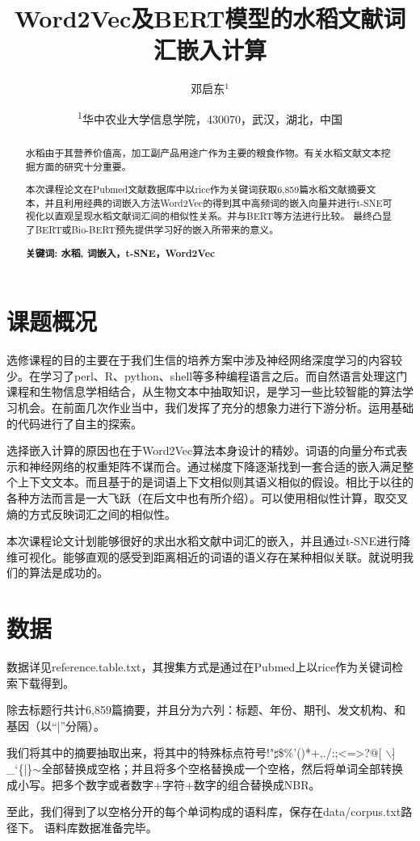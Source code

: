 \documentclass{article}
\title{Word2Vec及BERT模型的水稻文献词汇嵌入计算}%
\author{邓启东$^{1}$}
\date{
\textsuperscript{1}华中农业大学信息学院，430070，武汉，湖北，中国}
\begin{document}
\maketitle


\begin{abstract}

水稻由于其营养价值高，加工副产品用途广作为主要的粮食作物。有关水稻文献文本挖掘方面的研究十分重要。\par 本次课程论文在Pubmed文献数据库中以rice作为关键词获取6,859篇水稻文献摘要文本，并且利用经典的词嵌入方法Word2Vec的得到其中高频词的嵌入向量并进行t-SNE可视化以直观呈现水稻文献词汇间的相似性关系。并与BERT等方法进行比较。
最终凸显了BERT或Bio-BERT预先提供学习好的嵌入所带来的意义。

{\bf 关键词: 水稻, 词嵌入，t-SNE，Word2Vec}
\end{abstract}


\maketitle

\section{课题概况}
选修课程的目的主要在于我们生信的培养方案中涉及神经网络深度学习的内容较少。在学习了perl、R、python、shell等多种编程语言之后。而自然语言处理这门课程和生物信息学相结合，从生物文本中抽取知识，是学习一些比较智能的算法学习机会。在前面几次作业当中，我们发挥了充分的想象力进行下游分析。运用基础的代码进行了自主的探索。\par
选择嵌入计算的原因也在于Word2Vec算法本身设计的精妙。词语的向量分布式表示和神经网络的权重矩阵不谋而合。通过梯度下降逐渐找到一套合适的嵌入满足整个上下文文本。而且基于的是词语上下文相似则其语义相似的假设。相比于以往的各种方法而言是一大飞跃（在后文中也有所介绍）。可以使用相似性计算，取交叉熵的方式反映词汇之间的相似性。\par
本次课程论文计划能够很好的求出水稻文献中词汇的嵌入，并且通过t-SNE进行降维可视化。能够直观的感受到距离相近的词语的语义存在某种相似关联。就说明我们的算法是成功的。


\section{数据}

数据详见reference.table.txt，其搜集方式是通过在Pubmed上以rice作为关键词检索下载得到。\par
除去标题行共计6,859篇摘要，并且分为六列：标题、年份、期刊、发文机构、和基因（以``|''分隔）。\par
我们将其中的摘要抽取出来，将其中的特殊标点符号!"$\sharp$\$\%'()*+,./:;<=>?@[ $\backslash$]$\hat{}$\_`\{|\}$ \sim $全部替换成空格；并且将多个空格替换成一个空格，然后将单词全部转换成小写。把多个数字或者数字+字符+数字的组合替换成NBR。\par
至此，我们得到了以空格分开的每个单词构成的语料库，保存在data/corpus.txt路径下。
语料库数据准备完毕。
\end{document}
